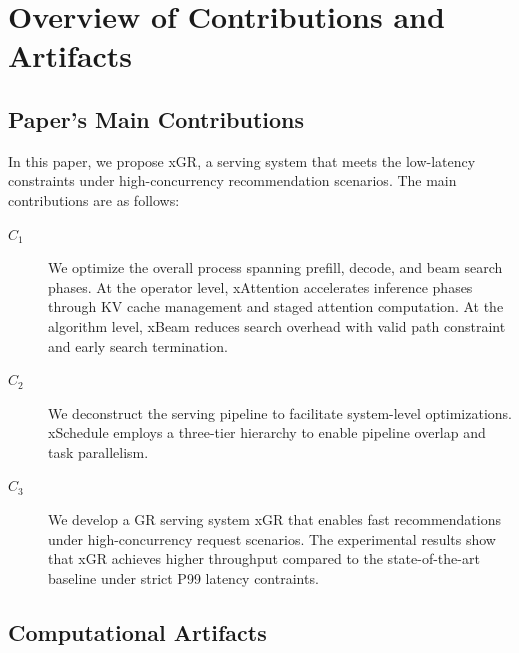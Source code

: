 \documentclass[nonacm,sigconf]{acmart}
\begin{document}


\appendixAD

\section{Overview of Contributions and Artifacts}

\subsection{Paper's Main Contributions}

In this paper, we propose xGR, a serving system that meets the low-latency constraints under high-concurrency recommendation scenarios. The main contributions are as follows:

\begin{description}
\item[$C_1$] We optimize the overall process spanning prefill, decode, and beam search phases. At the operator level, xAttention accelerates inference phases through KV cache management and staged attention computation. At the algorithm level, xBeam reduces search overhead with valid path constraint and early search termination.
\item[$C_2$] We deconstruct the serving pipeline to facilitate system-level optimizations. xSchedule employs a three-tier hierarchy to enable pipeline overlap and task parallelism.
\item[$C_3$] We develop a GR serving system xGR that enables fast recommendations under high-concurrency request scenarios. The experimental results show that xGR achieves higher throughput compared to the state-of-the-art baseline under strict P99 latency contraints.
\end{description}


\subsection{Computational Artifacts}

\end{document}
